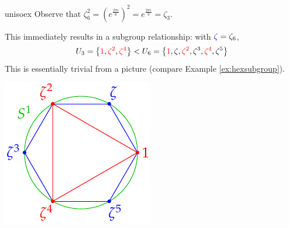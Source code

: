 \begin{examples}{}{unisoex}
	\exstart Observe that $\zeta_6^2=(e^{\frac{2\pi i}6})^2 =e^{\frac{2\pi i}3} =\zeta_3$.\par
	\begin{enumerate}\setcounter{enumi}{1}
		\begin{minipage}[t]{0.75\linewidth}\vspace{-4pt}
			\item[]This immediately results in a subgroup relationship: with $\textcolor{blue}{\zeta}=\zeta_6$, 
			\[
				U_3 = \bigl\{\textcolor{red}{1},\textcolor{red}{\zeta^2},\textcolor{red}{\zeta^4}\bigr\}  < U_6 = \bigl\{\textcolor{red}{1},\zeta,\textcolor{red}{\zeta^2},\zeta^3,\textcolor{red}{\zeta^4},\zeta^5\bigr\}
			\]
			This is essentially trivial from a picture (compare Example \ref{ex:hexsubgroup}).
		\end{minipage}
		\hfill
		\begin{minipage}[t]{0.24\linewidth}\vspace{-30pt}
			\flushright\includegraphics[scale=0.8]{cyclic-hexagon}
		\end{minipage}
	  

\end{enumerate}
\end{examples}

